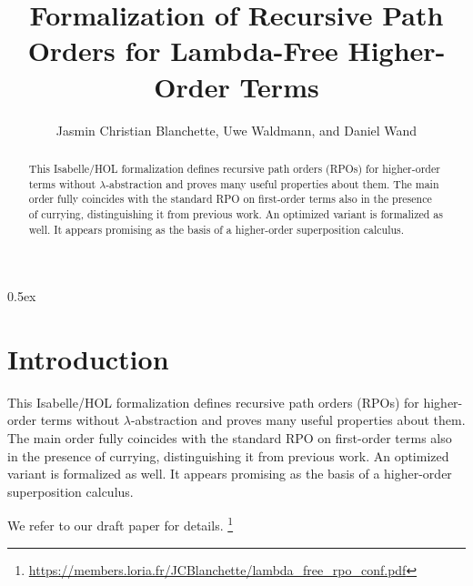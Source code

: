 \documentclass[10pt,a4paper]{article}
\begin{document}
\title{Formalization of Recursive Path Orders for Lambda-Free Higher-Order Terms}
\author{Jasmin Christian Blanchette, Uwe Waldmann, and Daniel Wand}

\maketitle

\begin{abstract}
\noindent
This Isabelle/HOL formalization defines recursive path orders (RPOs) for
higher-order terms without $\lambda$-abstraction and proves many useful
properties about them. The main order fully coincides with the standard RPO on
first-order terms also in the presence of currying, distinguishing it from
previous work. An optimized variant is formalized as well. It appears
promising as the basis of a higher-order superposition calculus.
\end{abstract}

\tableofcontents

\parindent 0pt
\parskip 0.5ex

\section{Introduction}

This Isabelle/HOL formalization defines recursive path orders (RPOs) for
higher-order terms without $\lambda$-abstraction and proves many useful
properties about them. The main order fully coincides with the standard RPO on
first-order terms also in the presence of currying, distinguishing it from
previous work. An optimized variant is formalized as well. It appears
promising as the basis of a higher-order superposition calculus.

We refer to our draft paper for details.%
\footnote{\url{https://members.loria.fr/JCBlanchette/lambda_free_rpo_conf.pdf}}



%
%

%
%
\end{document}
